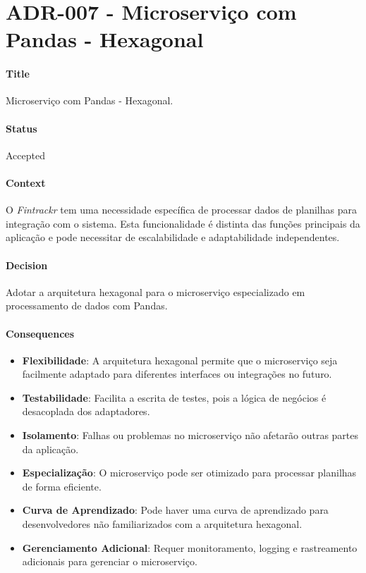
\chapter{ADR-007 - Microserviço com Pandas - Hexagonal}
\label{apendiceADR007}

\subsubsection*{Title}
Microserviço com Pandas - Hexagonal.

\subsubsection*{Status}
Accepted

\subsubsection*{Context}
O \textit{Fintrackr} tem uma necessidade específica de processar dados de planilhas para integração com o sistema. Esta funcionalidade é distinta das funções principais da aplicação e pode necessitar de escalabilidade e adaptabilidade independentes.

\subsubsection*{Decision}
Adotar a arquitetura hexagonal para o microserviço especializado em processamento de dados com Pandas.

\subsubsection*{Consequences}
\begin{itemize}
	\item \textbf{Flexibilidade}: A arquitetura hexagonal permite que o microserviço seja facilmente adaptado para diferentes interfaces ou integrações no futuro.
	\item \textbf{Testabilidade}: Facilita a escrita de testes, pois a lógica de negócios é desacoplada dos adaptadores.
	\item \textbf{Isolamento}: Falhas ou problemas no microserviço não afetarão outras partes da aplicação.
	\item \textbf{Especialização}: O microserviço pode ser otimizado para processar planilhas de forma eficiente.
	\item \textbf{Curva de Aprendizado}: Pode haver uma curva de aprendizado para desenvolvedores não familiarizados com a arquitetura hexagonal.
	\item \textbf{Gerenciamento Adicional}: Requer monitoramento, logging e rastreamento adicionais para gerenciar o microserviço.
\end{itemize}




\newpage
